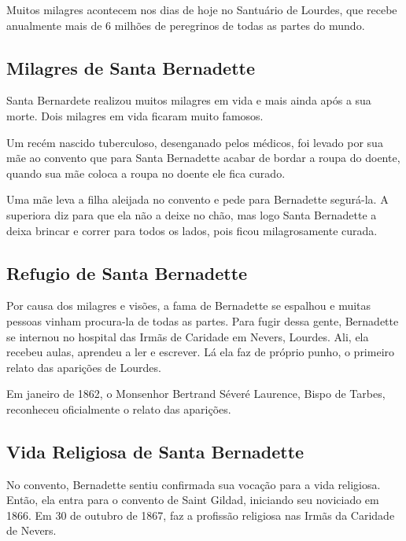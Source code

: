 \documentclass[18pt]{article}
\begin{document}
\begin{justify}
Muitos milagres acontecem nos dias de hoje no Santuário de Lourdes, que recebe anualmente mais de 6 milhões de peregrinos de todas as partes do mundo.


\begin{justify}
\subsection{Milagres de Santa Bernadette}
\end{justify}

Santa Bernardete realizou muitos milagres em vida e mais ainda após a sua morte. Dois milagres em vida ficaram muito famosos.

Um recém nascido tuberculoso, desenganado pelos médicos, foi levado por sua mãe ao convento que para Santa Bernadette acabar de bordar a roupa do doente, quando sua mãe coloca a roupa no doente ele fica curado.

Uma mãe leva a filha aleijada no convento e pede para Bernadette segurá-la. A superiora diz para que ela não a deixe no chão, mas logo Santa Bernadette a deixa brincar e correr para todos os lados, pois ficou milagrosamente curada.


\begin{justify}
\subsection{Refugio de Santa Bernadette}
\end{justify}

Por causa dos milagres e visões, a fama de Bernadette se espalhou e muitas pessoas vinham procura-la de todas as partes. Para fugir dessa gente, Bernadette se internou no hospital das Irmãs de Caridade em Nevers, Lourdes. Ali, ela recebeu aulas, aprendeu a ler e escrever. Lá ela faz de próprio punho, o primeiro relato das aparições de Lourdes.

Em janeiro de 1862, o Monsenhor Bertrand Séveré Laurence, Bispo de Tarbes, reconheceu oficialmente o relato das aparições.


\begin{justify}
\subsection{Vida Religiosa de Santa Bernadette}
\end{justify}

No convento, Bernadette sentiu confirmada sua vocação para a vida religiosa. Então, ela entra para o convento de Saint Gildad, iniciando seu noviciado em 1866. Em 30 de outubro de 1867, faz a profissão religiosa nas Irmãs da Caridade de Nevers.


\end{justify}
\end{document}
